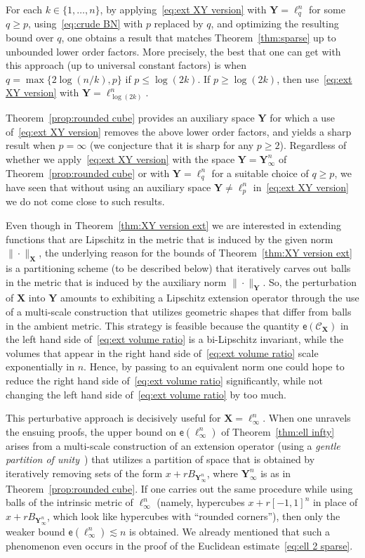 \documentclass[11pt,reqno]{amsart}
\renewcommand{\le}{\leqslant}
\renewcommand{\ge}{\geqslant}
\newcommand{\n}{\{1,\ldots,n\}}
\newcommand{\X}{\mathbf X}
\newcommand{\Y}{\mathbf Y}
\theoremstyle{remark}
\newcommand{\ee}{\mathsf{e}}
\newcommand{\sub}{\mathscr{C}}
\renewcommand{\1}{\mathbf 1}
\begin{document}
For each $k\in \n$, by applying~\eqref{eq:ext XY version} with $\Y=\ell_q^n$ for some $q\ge p$, using~\eqref{eq:crude BN}  with $p$ replaced by $q$, and  optimizing the resulting bound over $q$, one obtains a result that matches Theorem~\ref{thm:sparse} up to unbounded lower order factors. More precisely,  the best that one can get with this approach (up to universal constant factors)  is when $q=\max\{2\log(n/k),p\}$ if $p\le \log (2k)$. If $p\ge \log(2k)$, then use~\eqref{eq:ext XY version} with $\Y=\ell_{\log(2k)}^n$.


Theorem~\ref{prop:rounded cube} provides an auxiliary space $\Y$ for which a use of~\eqref{eq:ext XY version} removes the above lower order factors, and yields a sharp result when $p=\infty$ (we conjecture that it is sharp for any $p\ge 2$). Regardless of whether we apply~\eqref{eq:ext XY version} with the space $\Y=\Y_\infty^n$ of Theorem~\ref{prop:rounded cube}  or with $\Y=\ell_q^n$ for a suitable choice of $q\ge p$, we have seen  that without using an auxiliary space $\Y\neq \ell_p^n$ in~\eqref{eq:ext XY version} we do not come close to such results.






Even though in Theorem~\ref{thm:XY version ext} we are interested in extending functions that are Lipschitz in the metric that is induced by the given norm $\|\cdot\|_\X$, the underlying reason for the bounds of Theorem~\ref{thm:XY version ext} is a partitioning scheme  (to be described below) that iteratively carves out  balls in the metric that is induced by the auxiliary norm $\|\cdot\|_{\Y}$.  So, the  perturbation of $\X$ into $\Y$  amounts to exhibiting  a Lipschitz extension operator through the use of a multi-scale construction that utilizes geometric shapes that differ from balls in the ambient metric.  This strategy is feasible because the quantity $\ee(\sub_{\X})$ in the left hand side of~\eqref{eq:ext volume ratio} is a bi-Lipschitz invariant, while the volumes that appear in the right hand side of~\eqref{eq:ext volume ratio} scale exponentially in $n$. Hence, by passing to an equivalent norm one could hope to reduce the right hand side of~\eqref{eq:ext volume ratio} significantly, while not changing the left hand side of~\eqref{eq:ext volume ratio} by too much.


This perturbative approach is decisively useful for $\X=\ell_\infty^n$. When one unravels the ensuing proofs,  the upper bound on $\ee(\ell_\infty^n)$ of Theorem~\ref{thm:ell infty} arises from a multi-scale construction of an extension operator (using a {\em gentle partition of unity}~\cite{LN05}) that utilizes a partition of space that is obtained by iteratively  removing sets of the form $x+rB_{\Y_\infty^n}$, where $\Y_\infty^n$ is as in Theorem~\ref{prop:rounded cube}. If one carries out the same  procedure while using  balls of the intrinsic metric of $\ell_\infty^n$ (namely, hypercubes $x+r[-1,1]^n$ in place of  $x+rB_{\Y_\infty^n}$, which look like hypercubes with ``rounded corners''), then only the weaker  bound  $\ee(\ell_\infty^n)\lesssim n$ is obtained. We already mentioned that such a phenomenon even occurs in the proof of the Euclidean estimate~\eqref{eq:ell 2 sparse}.
\end{document}
